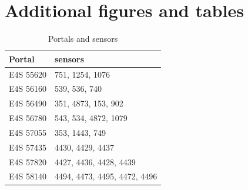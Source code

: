 	\section{ Additional figures and tables}
		\begin{table}[H]
		\centering
		\caption{Portals and sensors}
		\label{tab:portalsandsensors}
		\begin{tabular}{|l|l|}
			\hline
			Portal & sensors \\
			\hline
			E4S 55620 & 751, 1254, 1076 \\
			E4S 56160 & 539, 536, 740 \\
			E4S 56490 & 351, 4873, 153, 902 \\
			E4S 56780 & 543, 534, 4872, 1079 \\
			E4S 57055 & 353, 1443, 749 \\
			E4S 57435 & 4430, 4429, 4437 \\
			E4S 57820 & 4427, 4436, 4428, 4439 \\
			E4S 58140 & 4494, 4473, 4495, 4472, 4496 \\
			\hline
		\end{tabular}
	\end{table}
	
